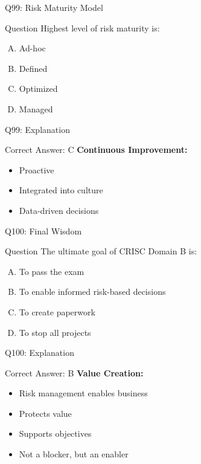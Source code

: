 \documentclass{beamer}
\begin{document}
			\begin{frame}{Q99: Risk Maturity Model}
				\begin{block}{Question}
					Highest level of risk maturity is:
				\end{block}
				\begin{enumerate}[(A)]
					\item Ad-hoc
					\item Defined
					\item Optimized
					\item Managed
				\end{enumerate}
			\end{frame}
			\begin{frame}{Q99: Explanation}
				\begin{block}{Correct Answer: C}
					\textbf{Continuous Improvement:}
					\begin{itemize}
						\item Proactive
						\item Integrated into culture
						\item Data-driven decisions
					\end{itemize}
				\end{block}
			\end{frame}
			
			\begin{frame}{Q100: Final Wisdom}
				\begin{block}{Question}
					The ultimate goal of CRISC Domain B is:
				\end{block}
				\begin{enumerate}[(A)]
					\item To pass the exam
					\item To enable informed risk-based decisions
					\item To create paperwork
					\item To stop all projects
				\end{enumerate}
			\end{frame}
			\begin{frame}{Q100: Explanation}
				\begin{block}{Correct Answer: B}
					\textbf{Value Creation:}
					\begin{itemize}
						\item Risk management enables business
						\item Protects value
						\item Supports objectives
						\item Not a blocker, but an enabler
					\end{itemize}
				\end{block}
			\end{frame}
			
\end{document}
